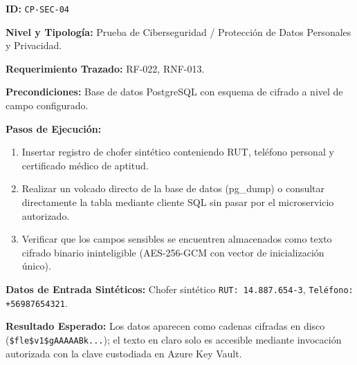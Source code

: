 \par\noindent\textbf{ID:} \texttt{C\allowbreak{}P\allowbreak{}-\allowbreak{}S\allowbreak{}E\allowbreak{}C\allowbreak{}-\allowbreak{}0\allowbreak{}4\allowbreak{}}\par
\par\noindent\textbf{Nivel y Tipología:} Prueba de Ciberseguridad / Protección de Datos Personales y Privacidad.\par
\par\noindent\textbf{Requerimiento Trazado:} RF-022, RNF-013.\par
\par\noindent\textbf{Precondiciones:} Base de datos PostgreSQL con esquema de cifrado a nivel de campo configurado.\par
\par\noindent\textbf{Pasos de Ejecución:} \par
\begin{enumerate}
\item Insertar registro de chofer sintético conteniendo RUT, teléfono personal y certificado médico de aptitud.
\item Realizar un volcado directo de la base de datos (pg\_dump) o consultar directamente la tabla mediante cliente SQL sin pasar por el microservicio autorizado.
\item Verificar que los campos sensibles se encuentren almacenados como texto cifrado binario ininteligible (AES-256-GCM con vector de inicialización único).
\end{enumerate}
\par\noindent\textbf{Datos de Entrada Sintéticos:} Chofer sintético \texttt{R\allowbreak{}U\allowbreak{}T\allowbreak{}:\allowbreak{} 1\allowbreak{}4\allowbreak{}.\allowbreak{}8\allowbreak{}8\allowbreak{}7\allowbreak{}.\allowbreak{}6\allowbreak{}5\allowbreak{}4\allowbreak{}-\allowbreak{}3\allowbreak{}}, \texttt{T\allowbreak{}e\allowbreak{}l\allowbreak{}é\allowbreak{}f\allowbreak{}o\allowbreak{}n\allowbreak{}o\allowbreak{}:\allowbreak{} +\allowbreak{}5\allowbreak{}6\allowbreak{}9\allowbreak{}8\allowbreak{}7\allowbreak{}6\allowbreak{}5\allowbreak{}4\allowbreak{}3\allowbreak{}2\allowbreak{}1\allowbreak{}}.\par
\par\noindent\textbf{Resultado Esperado:} Los datos aparecen como cadenas cifradas en disco (\texttt{\$\allowbreak{}f\allowbreak{}l\allowbreak{}e\allowbreak{}\$\allowbreak{}v\allowbreak{}1\allowbreak{}\$\allowbreak{}g\allowbreak{}A\allowbreak{}A\allowbreak{}A\allowbreak{}A\allowbreak{}A\allowbreak{}B\allowbreak{}k\allowbreak{}.\allowbreak{}.\allowbreak{}.\allowbreak{}}); el texto en claro solo es accesible mediante invocación autorizada con la clave custodiada en Azure Key Vault.\par
